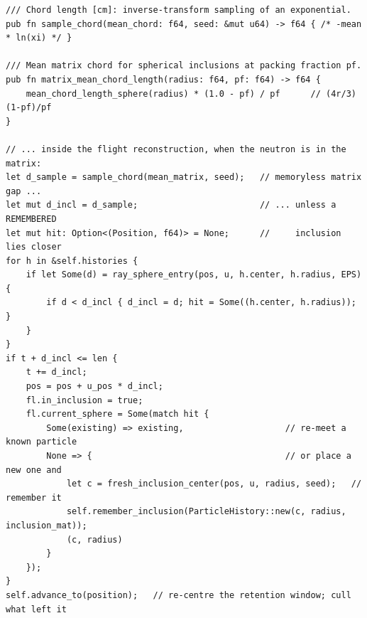 \documentclass[11pt]{article}
\begin{document}
\begin{lstlisting}[caption={Semi-implicit chord-length sampling (SCLS). No
  geometry is stored; the matrix gap to the next inclusion is drawn from the
  Markovian chord distribution $\ell = -\langle\ell\rangle \ln \xi$ with
  $\langle\ell_{\mathrm{matrix}}\rangle = \tfrac{4r}{3}\,(1-p_f)/p_f$. The
  \emph{semi-implicit} part is lines 9--15: inclusions already met are retained
  inside a moving window, and if a remembered sphere lies nearer along the ray
  than the freshly sampled chord, the neutron re-meets that particle instead of
  an independent one. This restores exactly the correlation that plain CLS
  discards on back-scatter.},
  label={lst:scls}]
/// Chord length [cm]: inverse-transform sampling of an exponential.
pub fn sample_chord(mean_chord: f64, seed: &mut u64) -> f64 { /* -mean * ln(xi) */ }

/// Mean matrix chord for spherical inclusions at packing fraction pf.
pub fn matrix_mean_chord_length(radius: f64, pf: f64) -> f64 {
    mean_chord_length_sphere(radius) * (1.0 - pf) / pf      // (4r/3)(1-pf)/pf
}

// ... inside the flight reconstruction, when the neutron is in the matrix:
let d_sample = sample_chord(mean_matrix, seed);   // memoryless matrix gap ...
let mut d_incl = d_sample;                        // ... unless a REMEMBERED
let mut hit: Option<(Position, f64)> = None;      //     inclusion lies closer
for h in &self.histories {
    if let Some(d) = ray_sphere_entry(pos, u, h.center, h.radius, EPS) {
        if d < d_incl { d_incl = d; hit = Some((h.center, h.radius)); }
    }
}
if t + d_incl <= len {
    t += d_incl;
    pos = pos + u_pos * d_incl;
    fl.in_inclusion = true;
    fl.current_sphere = Some(match hit {
        Some(existing) => existing,                    // re-meet a known particle
        None => {                                      // or place a new one and
            let c = fresh_inclusion_center(pos, u, radius, seed);   // remember it
            self.remember_inclusion(ParticleHistory::new(c, radius, inclusion_mat));
            (c, radius)
        }
    });
}
self.advance_to(position);   // re-centre the retention window; cull what left it
\end{lstlisting}
\end{document}
